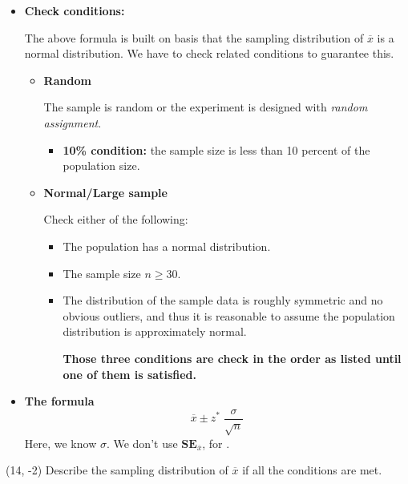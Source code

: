 \documentclass[a4paper, 12pt,twoside]{book}
\begin{document}
 \begin{itemize}
     \item \textbf{Check conditions:}\vspace{0.3cm}
     
     The above formula is built on basis that the sampling distribution of $\overline{x}$ is a normal distribution. We have to check related conditions to guarantee this.
     \begin{itemize}
        \item \textbf{Random}\vspace{0.3cm}
        
        The sample is random or the experiment is designed with \textit{random assignment}.
        \begin{itemize}
         \item \textbf{10\% condition:} the sample size is less than 10 percent of the population size.
        \end{itemize}
        
     \item \textbf{Normal/Large sample}\vspace{0.3cm}
     
     Check either of the following:
     \begin{itemize}
         \item The population has a normal distribution.
         \item The sample size $n \geq 30$.
         \item The distribution of the sample data is  roughly symmetric and no obvious outliers, and thus it is reasonable to assume the population distribution is approximately normal.\vspace{0.3cm}
         
            \colorbox{babypink}{\parbox{0.8\textwidth}{
  \textbf{Those three conditions are check in the order as listed until one of them is satisfied.}
   }}
     \end{itemize}    
     \end{itemize}
      \vspace{0.6cm}
      
             
    \item \textbf{The formula}    
    $$\overline{x} \pm z^*\;\frac{\sigma}{\sqrt{n}}$$
    Here, we know $\sigma$. We don't use $\textbf{SE}_{\overline{x}}$, for .
 \end{itemize}
 \begin{textblock}{4.5}(14, -2) 
    Describe the sampling distribution of $\overline{x}$ if all the conditions are met.
   \end{textblock}
 \newpage
\end{document}
